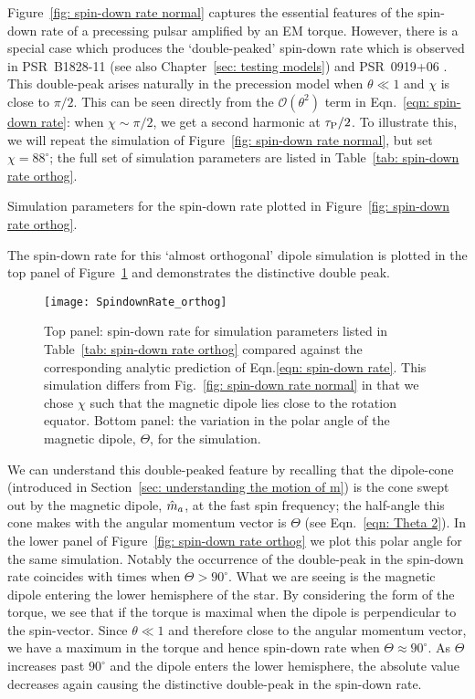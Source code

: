 \documentclass[../full_thesis/full_thesis.tex]{subfiles}
\newcommand{\thisdir}{../inertial_frame}
\begin{document}
Figure~\ref{fig: spin-down rate normal} captures the essential features of the
spin-down rate of a precessing pulsar amplified by an EM torque. However, there
is a special case which produces the `double-peaked' spin-down rate which is
observed in PSR~B1828-11 \citep{Lyne2010} (see also Chapter~\ref{sec: testing
models}) and PSR~0919+06 \citep{Perera2015}.  This double-peak arises naturally
in the precession model when $\theta \ll 1$ and $\chi$ is close to $\pi/2$.
This can be seen directly from the $\mathcal{O}(\theta^{2})$ term in
Eqn.~\eqref{eqn: spin-down rate}: when $\chi \sim \pi/2$, we get a second
harmonic at $\tau_{\mathrm{P}}/2$. To illustrate this, we will repeat the simulation of
Figure~\ref{fig: spin-down rate normal}, but set $\chi=88^{\circ}$; the full
set of simulation parameters are listed in Table~\ref{tab: spin-down rate
orthog}.
\begin{table}[htb]
\centering

\caption{Simulation parameters for the spin-down rate plotted in Figure~\ref{fig:
spin-down rate orthog}.}
\label{tab: spin-down rate orthog}
\end{table}
The spin-down rate for this `almost orthogonal' dipole simulation is plotted
in the top panel of Figure~\ref{fig: spin-down rate orthog} and demonstrates the
distinctive double peak.
\begin{figure}[htb]
\centering
\texttt{[image: SpindownRate\_orthog]}
\caption{Top panel: spin-down rate for simulation parameters listed in Table~\ref{tab:
spin-down rate orthog} compared against the corresponding analytic prediction
of Eqn.\eqref{eqn: spin-down rate}. This simulation differs from
Fig.~\ref{fig: spin-down rate normal} in that we chose $\chi$ such that the
magnetic dipole lies close to the rotation equator. Bottom panel: the variation
in the polar angle of the magnetic dipole, $\Theta$, for the simulation.}
\label{fig: spin-down rate orthog}
\end{figure}

We can understand this double-peaked feature by recalling that the dipole-cone
(introduced in Section~\ref{sec: understanding the motion of m}) is the
cone swept out by the magnetic dipole, $\hat{m}_a$, at the fast spin frequency; the
half-angle this cone makes with the angular momentum vector is $\Theta$ (see
Eqn.~\eqref{eqn: Theta 2}).  In the lower panel of Figure~\ref{fig: spin-down
rate orthog} we plot this polar angle for the same simulation. Notably the
occurrence of the double-peak in the spin-down rate coincides with times when
$\Theta > 90^{\circ}$. What we are seeing is the magnetic dipole entering the
lower hemisphere of the star. By considering the form of the
\citet{Deutsch1955} torque, we see that if the torque is maximal when the
dipole is perpendicular to the spin-vector. Since $\theta \ll 1$ and therefore
close to the angular momentum vector, we have a maximum in the torque and hence
spin-down rate when $\Theta \approx 90^{\circ}$. As $\Theta$ increases past
$90^{\circ}$ and the dipole enters the lower hemisphere, the absolute value
decreases again causing the distinctive double-peak in the spin-down rate.
\end{document}
